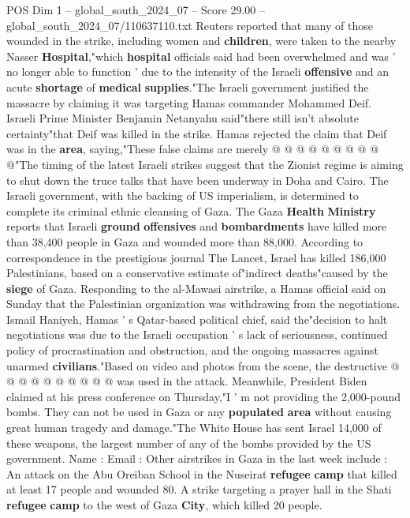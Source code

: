 \begin{textsample}{POS Dim 1 – global\_south\_2024\_07 – Score 29.00 – global\_south\_2024\_07/110637110.txt}
Reuters reported that many of those wounded in the strike, including women and \textbf{children}, were taken to the nearby Nasser \textbf{Hospital},"which \textbf{hospital} officials said had been overwhelmed and was ' no longer able to function ' due to the intensity of the Israeli \textbf{offensive} and an acute \textbf{shortage} of \textbf{medical} \textbf{supplies}."The Israeli government justified the massacre by claiming it was targeting Hamas commander Mohammed Deif.
Israeli Prime Minister Benjamin Netanyahu said"there still isn't absolute certainty"that Deif was killed in the strike.
Hamas rejected the claim that Deif was in the \textbf{area}, saying,"These false claims are merely @ @ @ @ @ @ @ @ @ @"The timing of the latest Israeli strikes suggest that the Zionist regime is aiming to shut down the truce talks that have been underway in Doha and Cairo.
The Israeli government, with the backing of US imperialism, is determined to complete its criminal ethnic cleansing of Gaza.
The Gaza \textbf{Health} \textbf{Ministry} reports that Israeli \textbf{ground} \textbf{offensives} and \textbf{bombardments} have killed more than 38,400 people in Gaza and wounded more than 88,000.
According to correspondence in the prestigious journal The Lancet, Israel has killed 186,000 Palestinians, based on a conservative estimate of"indirect deaths"caused by the \textbf{siege} of Gaza.
Responding to the al-Mawasi airstrike, a Hamas official said on Sunday that the Palestinian organization was withdrawing from the negotiations.
Ismail Haniyeh, Hamas ' s Qatar-based political chief, said the"decision to halt negotiations was due to the Israeli occupation ' s lack of seriousness, continued policy of procrastination and obstruction, and the ongoing massacres against unarmed \textbf{civilians}."Based on video and photos from the scene, the destructive @ @ @ @ @ @ @ @ @ @ was used in the attack.
Meanwhile, President Biden claimed at his press conference on Thursday,"I ' m not providing the 2,000-pound bombs.
They can not be used in Gaza or any \textbf{populated} \textbf{area} without causing great human tragedy and damage."The White House has sent Israel 14,000 of these weapons, the largest number of any of the bombs provided by the US government.
Name : Email : Other airstrikes in Gaza in the last week include : An attack on the Abu Oreiban School in the Nuseirat \textbf{refugee} \textbf{camp} that killed at least 17 people and wounded 80.
A strike targeting a prayer hall in the Shati \textbf{refugee} \textbf{camp} to the west of Gaza \textbf{City}, which killed 20 people.

\end{textsample}
